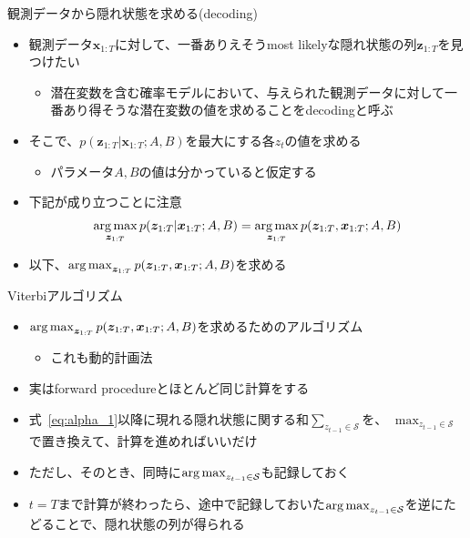 \documentclass[aspectratio=169,unicode,dvipdfmx,14pt]{beamer}
\begin{document}
\begin{frame}{観測データから隠れ状態を求める(decoding)}
\begin{itemize}
\item 観測データ$\bm{x}_{1:T}$に対して、一番ありえそうmost likelyな隠れ状態の列$\bm{z}_{1:T}$を見つけたい
\begin{itemize}
\item 潜在変数を含む確率モデルにおいて、与えられた観測データに対して一番あり得そうな潜在変数の値を求めることをdecodingと呼ぶ
\end{itemize}
\item そこで、$p(\bm{z}_{1:T}|\bm{x}_{1:T}; A,B)$を最大にする各$z_t$の値を求める
\begin{itemize}
\item パラメータ$A, B$の値は分かっていると仮定する
\end{itemize}
\item 下記が成り立つことに注意
\begin{align}
\operatorname*{arg\,max}_{\bm{z}_{1:T}} p(\bm{z}_{1:T}|\bm{x}_{1:T}; A,B) = 
\operatorname*{arg\,max}_{\bm{z}_{1:T}} p(\bm{z}_{1:T}, \bm{x}_{1:T}; A,B)
\notag
\end{align}
\item 以下、$\operatorname*{arg\,max}_{\bm{z}_{1:T}} p(\bm{z}_{1:T}, \bm{x}_{1:T}; A,B)$を求める
\end{itemize}
\end{frame}


\begin{frame}{Viterbiアルゴリズム}
\begin{itemize}
\item $\operatorname*{arg\,max}_{\bm{z}_{1:T}} p(\bm{z}_{1:T}, \bm{x}_{1:T}; A,B)$を求めるためのアルゴリズム
\begin{itemize}
\item これも動的計画法
\end{itemize}
\item 実はforward procedureとほとんど同じ計算をする
\item 式~\eqref{eq:alpha_1}以降に現れる隠れ状態に関する和$\sum_{z_{t-1} \in \mathcal{S}}$を、
$\max_{z_{t-1} \in \mathcal{S}}$で置き換えて、計算を進めればいいだけ
\item ただし、そのとき、同時に$\operatorname*{arg\,max}_{z_{t-1} \in \mathcal{S}}$も記録しておく
\item $t=T$まで計算が終わったら、途中で記録しておいた$\operatorname*{arg\,max}_{z_{t-1} \in \mathcal{S}}$を逆にたどることで、隠れ状態の列が得られる
\end{itemize}
\end{frame}
\end{document}
